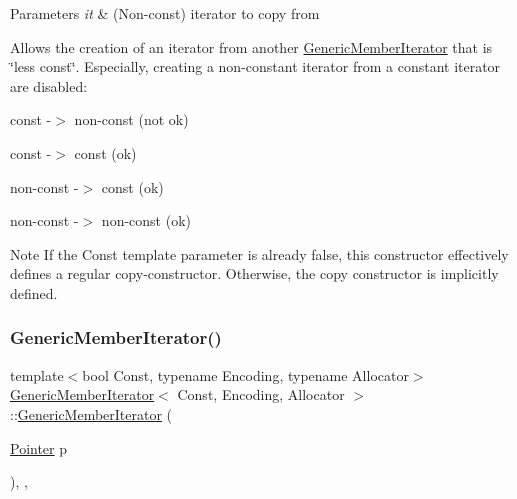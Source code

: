\begin{DoxyParams}{Parameters}
{\em it} & (Non-\/const) iterator to copy from\\
\hline
\end{DoxyParams}
Allows the creation of an iterator from another \hyperlink{classGenericMemberIterator}{Generic\+Member\+Iterator} that is \char`\"{}less const\char`\"{}. Especially, creating a non-\/constant iterator from a constant iterator are disabled\+: \begin{DoxyItemize}
\item const -\/$>$ non-\/const (not ok) \item const -\/$>$ const (ok) \item non-\/const -\/$>$ const (ok) \item non-\/const -\/$>$ non-\/const (ok)\end{DoxyItemize}
\begin{DoxyNote}{Note}
If the {\ttfamily Const} template parameter is already {\ttfamily false}, this constructor effectively defines a regular copy-\/constructor. Otherwise, the copy constructor is implicitly defined. 
\end{DoxyNote}
\mbox{\label{classGenericMemberIterator_a76c372cd90c8abff942ab054c4992c74}} 
\subsubsection{\texorpdfstring{Generic\+Member\+Iterator()}{GenericMemberIterator()}\hspace{0.1cm}{\footnotesize\ttfamily [3/3]}}
{\footnotesize\ttfamily template$<$bool Const, typename Encoding, typename Allocator$>$ \\
\hyperlink{classGenericMemberIterator}{Generic\+Member\+Iterator}$<$ Const, Encoding, Allocator $>$\+::\hyperlink{classGenericMemberIterator}{Generic\+Member\+Iterator} (\begin{DoxyParamCaption}\item[{\hyperlink{classGenericMemberIterator_ac0bd6e77617593892fc13afb00e62f29}{Pointer}}]{p }\end{DoxyParamCaption})\hspace{0.3cm}{\ttfamily [inline]}, {\ttfamily [explicit]}, {\ttfamily [private]}}



